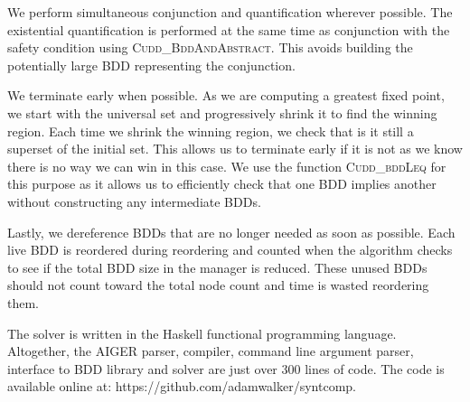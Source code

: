 We perform simultaneous conjunction and quantification wherever possible. The existential quantification is performed at the same time as conjunction with the safety condition using \textsc{Cudd\_BddAndAbstract}. This avoids building the potentially large BDD representing the conjunction.

We terminate early when possible. As we are computing a greatest fixed point, we start with the universal set and progressively shrink it to find the winning region. Each time we shrink the winning region, we check that is it still a superset of the initial set. This allows us to terminate early if it is not as we know there is no way we can win in this case. We use the function \textsc{Cudd\_bddLeq} for this purpose as it allows us to efficiently check that one BDD implies another without constructing any intermediate BDDs.

Lastly, we dereference BDDs that are no longer needed as soon as possible. Each live BDD is reordered during reordering and counted when the algorithm checks to see if the total BDD size in the manager is reduced. These unused BDDs should not count toward the total node count and time is wasted reordering them.

The solver is written in the Haskell functional programming language. Altogether, the AIGER parser, compiler, command line argument parser, interface to BDD library and solver are just over 300 lines of code. The code is available online at: https://github.com/adamwalker/syntcomp.
